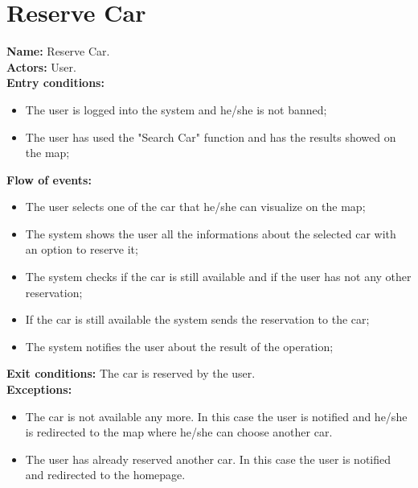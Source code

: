 \section*{Reserve Car}
\textbf{Name:} Reserve Car.\\
\textbf{Actors:} User.\\
\textbf{Entry conditions:}
\begin{itemize}
\item The user is logged into the system and he/she is not banned;
\item The user has used the "Search Car" function and has the results showed on the map;
\end{itemize}
\textbf{Flow of events:}
\begin{itemize}
\item The user selects one of the car that he/she can visualize on the map;
\item The system shows the user all the informations about the selected car with an option to reserve it;
\item The system checks if the car is still available and if the user has not any other reservation;
\item If the car is still available the system sends the reservation to the car;
\item The system notifies the user about the result of the operation;
\end{itemize}
\textbf{Exit conditions:} The car is reserved by the user.\\
\textbf{Exceptions:}
\begin{itemize}
\item The car is not available any more. In this case the user is notified and he/she is redirected to the map where he/she can choose another car.
\item The user has already reserved another car. In this case the user is notified and redirected to the homepage.
\end{itemize}


